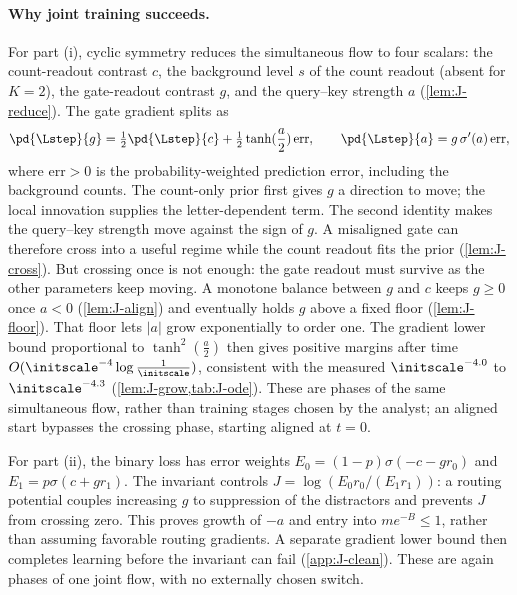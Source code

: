 \paragraph{Why joint training succeeds.} For part (i), cyclic symmetry reduces the simultaneous flow to four scalars: the count-readout contrast $c$,
the background level $s$ of the count readout (absent for $K=2$), the gate-readout contrast $g$, and the query--key strength $a$
(\cref{lem:J-reduce}). The gate gradient splits as
\[
 \pd{\Lstep}{g}=\tfrac{1}{2}\pd{\Lstep}{c}+\tfrac{1}{2}\tanh(\frac{a}{2})\,\mathrm{err},\qquad \pd{\Lstep}{a}=g\,\sigma'(a)\,\mathrm{err},
\]
where $\mathrm{err}>0$ is the probability-weighted prediction error, including the background counts. The count-only prior first
gives $g$ a direction to move; the local innovation supplies the letter-dependent term. The second identity makes the query--key
strength move against the sign of $g$. A misaligned gate can therefore cross into a useful regime while the count readout fits the
prior (\cref{lem:J-cross}). But crossing once is not enough: the gate readout must survive as the other parameters keep moving.
A monotone balance between $g$ and $c$ keeps $g\ge0$ once $a<0$ (\cref{lem:J-align}) and eventually holds $g$ above a fixed floor
(\cref{lem:J-floor}). That floor lets $|a|$ grow exponentially to order one. The gradient lower bound proportional to
$\tanh^2(\frac{a}{2})$ then gives positive margins after time $O(\initscale^{-4}\log\frac{1}{\initscale})$, consistent with the measured
$\initscale^{-4.0}$ to $\initscale^{-4.3}$ (\cref{lem:J-grow,tab:J-ode}). These are phases of the same simultaneous flow, rather than
training stages chosen by the analyst; an aligned start bypasses the crossing phase, starting aligned at $t=0$.

For part (ii), the binary loss has error weights $E_0=(1-p)\sigma(-c-gr_0)$ and $E_1=p\sigma(c+gr_1)$.
The invariant controls $J=\log(E_0r_0/(E_1r_1))$: a routing potential couples increasing $g$ to suppression of the distractors
and prevents $J$ from crossing zero. This proves growth of $-a$ and entry into $me^{-B}\le1$, rather than assuming favorable routing gradients.
A separate gradient lower bound then completes learning before the invariant can fail
(\cref{app:J-clean}). These are again phases of one joint flow, with no externally chosen switch.

